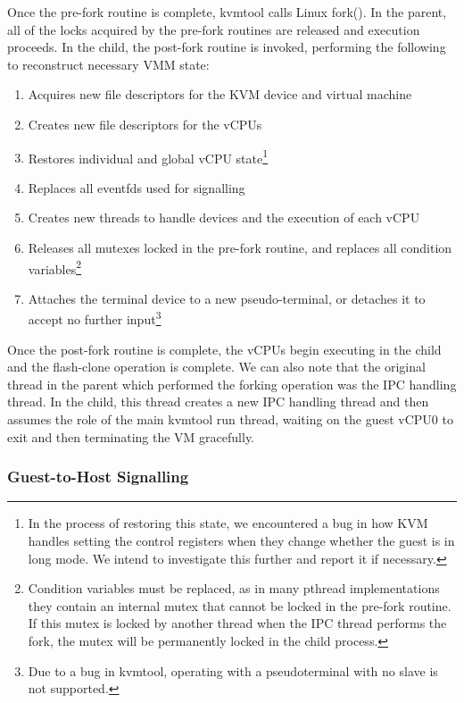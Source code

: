 Once the pre-fork routine is complete, kvmtool calls Linux fork(). In the
parent, all of the locks acquired by the pre-fork routines are released and
execution proceeds. In the child, the post-fork routine is invoked, performing
the following to reconstruct necessary VMM state:

\begin{enumerate}
\item Acquires new file descriptors for the KVM device and virtual machine
\item Creates new file descriptors for the vCPUs
\item Restores individual and global vCPU state\footnote{In the process of
restoring this state, we encountered a bug in how KVM handles setting the
control registers when they change whether the guest is in long mode. We intend
to investigate this further and report it if necessary.}
\item Replaces all eventfds used for signalling
\item Creates new threads to handle devices and the execution of each vCPU
\item Releases all mutexes locked in the pre-fork routine, and replaces all
condition variables\footnote{Condition variables must be replaced, as in many
pthread implementations they contain an internal mutex that cannot be locked in
the pre-fork routine. If this mutex is locked by another thread when the IPC
thread performs the fork, the mutex will be permanently locked in the child
process.}
\item Attaches the terminal device to a new pseudo-terminal, or detaches it to
accept no further input\footnote{Due to a bug in kvmtool, operating with a
pseudoterminal with no slave is not supported.}
\end{enumerate}

Once the post-fork routine is complete, the vCPUs begin executing in the child
and the flash-clone operation is complete. We can also note that the original
thread in the parent which performed the forking operation was the IPC handling
thread. In the child, this thread creates a new IPC handling thread and then
assumes the role of the main kvmtool run thread, waiting on the guest vCPU0 to
exit and then terminating the VM gracefully.

\subsubsection{Guest-to-Host Signalling}

